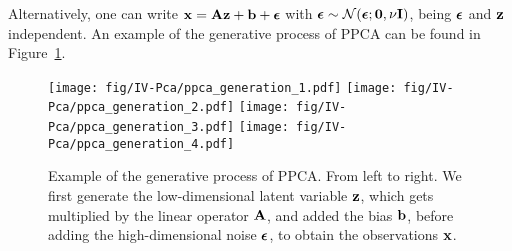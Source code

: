 \vspace{3mm}

\vspace{3mm}

Alternatively, one can write $\boldsymbol{\mathbf{x}}=\boldsymbol{\mathbf{A}}\boldsymbol{\mathbf{z}}+\boldsymbol{\mathbf{b}}+\boldsymbol{\mathbf{\epsilon}}$ with $\boldsymbol{\mathbf{\epsilon}}\sim\mathcal{N}(\boldsymbol{\mathbf{\epsilon}};\boldsymbol{\mathbf{0}},\nu\boldsymbol{\mathbf{I}})$, being $\boldsymbol{\mathbf{\epsilon}}$ and $\boldsymbol{\mathbf{z}}$ independent. An example of the generative process of PPCA can be found in Figure~\ref{fig:ppca-gen}.

\begin{figure}[H]
\centering\hfill
\texttt{[image: fig/IV-Pca/ppca\_generation\_1.pdf]}\hfill
\texttt{[image: fig/IV-Pca/ppca\_generation\_2.pdf]}\hfill
\texttt{[image: fig/IV-Pca/ppca\_generation\_3.pdf]}\hfill
\texttt{[image: fig/IV-Pca/ppca\_generation\_4.pdf]}\hfill
\caption{Example of the generative process of PPCA. From left to right. We first generate the low-dimensional latent variable $\boldsymbol{\mathbf{z}}$, which gets multiplied by the linear operator $\boldsymbol{\mathbf{A}}$, and added the bias $\boldsymbol{\mathbf{b}}$, before adding the high-dimensional noise $\boldsymbol{\mathbf{\epsilon}}$, to obtain the observations $\boldsymbol{\mathbf{x}}$.\label{fig:ppca-gen}}
\end{figure}

\vspace{3mm}


